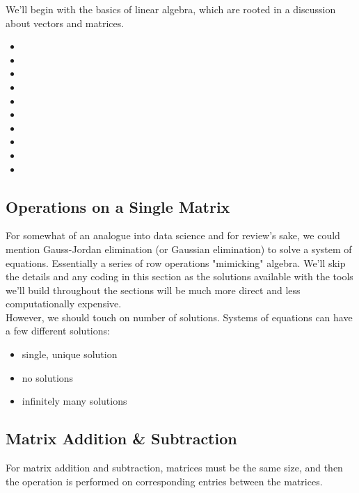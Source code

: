 
We'll begin with the basics of linear algebra, which are rooted in a discussion about vectors and matrices.

\begin{itemize}
	\item {}
	\item {}
	\item {}
	\item {}
	\item {}
	\item {}
	\item {}
	\item {}
	\item {}
	\item {}
\end{itemize}

\subsection{Operations on a Single Matrix}\label{concept1.1}
For somewhat of an analogue into data science and for review's sake, we could mention Gauss-Jordan elimination (or Gaussian elimination) to solve a system of equations. Essentially a series of row operations "mimicking" algebra. We'll skip the details and any coding in this section as the solutions available with the tools we'll build throughout the sections will be much more direct and less computationally expensive.
\\

However, we should touch on number of solutions. Systems of equations can have a few different solutions:
\begin{itemize}
	\item single, unique solution
	\item no solutions
	\item infinitely many solutions
\end{itemize}

\subsection{Matrix Addition \& Subtraction}\label{concept1.2}
For matrix addition and subtraction, matrices must be the same size, and then the operation is performed on corresponding entries between the matrices.

